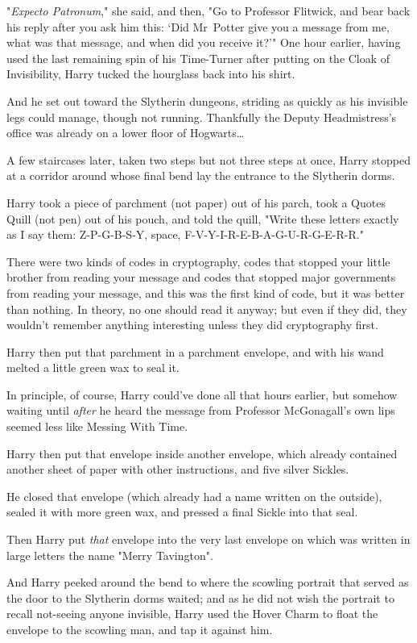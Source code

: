 "\emph{Expecto Patronum}," she said, and then, "Go to Professor Flitwick, and
bear back his reply after you ask him this: `Did Mr~Potter give you a message
from me, what was that message, and when did you receive it?'"
\later
One hour earlier, having used the last remaining spin of his Time-Turner after
putting on the Cloak of Invisibility, Harry tucked the hourglass back into his
shirt.

And he set out toward the Slytherin dungeons, striding as quickly as his
invisible legs could manage, though not running. Thankfully the Deputy
Headmistress's office was already on a lower floor of Hogwarts…

A few staircases later, taken two steps but not three steps at once, Harry
stopped at a corridor around whose final bend lay the entrance to the Slytherin
dorms.

Harry took a piece of parchment (not paper) out of his parch, took a Quotes
Quill (not pen) out of his pouch, and told the quill, "Write these letters
exactly as I say them: Z-P-G-B-S-Y, space, F-V-Y-I-R-E-B-A-G-U-R-G-E-R-R."

There were two kinds of codes in cryptography, codes that stopped your little
brother from reading your message and codes that stopped major governments from
reading your message, and this was the first kind of code, but it was better
than nothing. In theory, no one should read it anyway; but even if they did,
they wouldn't remember anything interesting unless they did cryptography first.

Harry then put that parchment in a parchment envelope, and with his wand melted
a little green wax to seal it.

In principle, of course, Harry could've done all that hours earlier, but
somehow waiting until \emph{after} he heard the message from Professor
McGonagall's own lips seemed less like Messing With Time.

Harry then put that envelope inside another envelope, which already contained
another sheet of paper with other instructions, and five silver Sickles.

He closed that envelope (which already had a name written on the outside),
sealed it with more green wax, and pressed a final Sickle into that seal.

Then Harry put \emph{that} envelope into the very last envelope on which was
written in large letters the name "Merry Tavington".

And Harry peeked around the bend to where the scowling portrait that served as
the door to the Slytherin dorms waited; and as he did not wish the portrait to
recall not-seeing anyone invisible, Harry used the Hover Charm to float the
envelope to the scowling man, and tap it against him.

